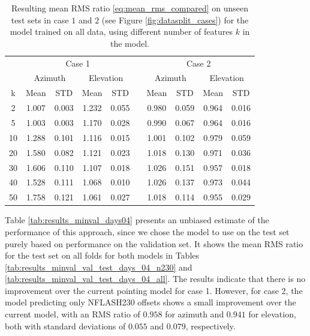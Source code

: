 \begin{table}[!htbp]
    \centering
    \caption[All instruments model results for complexity $k$]{%
    Resulting mean RMS ratio \eqref{eq:mean_rms_compared} on unseen test sets in case $1$ and $2$ (see Figure \ref{fig:datasplit_cases}) for the model trained on all data,
    using different number of features $k$ in the model.}
    \begin{tabular}{ccccc c cccc}
        \toprule
        \multicolumn{1}{c}{} & \multicolumn{4}{c}{Case 1} & & \multicolumn{4}{c}{Case 2} \\
        \cmidrule(lr){2-5} \cmidrule(lr){7-10}
        \multicolumn{1}{c}{} & \multicolumn{2}{c}{Azimuth} & \multicolumn{2}{c}{Elevation} & & \multicolumn{2}{c}{Azimuth} & \multicolumn{2}{c}{Elevation} \\ 
        \cmidrule(lr){2-5} \cmidrule(lr){7-10}
        k & Mean & STD & Mean & STD & & Mean & STD & Mean & STD \\ 
        \midrule
         2 &     1.007 &     0.003 &     1.232 &     0.055 &  &  0.980 &     0.059 &     0.964 &     0.016 \\
         5 &     1.003 &     0.003 &     1.170 &     0.028 &  &  0.990 &     0.067 &     0.964 &     0.016 \\
        10 &     1.288 &     0.101 &     1.116 &     0.015 &  &  1.001 &     0.102 &     0.979 &     0.059 \\
        20 &     1.580 &     0.082 &     1.121 &     0.023 &  &  1.018 &     0.130 &     0.971 &     0.036 \\
        30 &     1.606 &     0.110 &     1.107 &     0.018 &  &  1.026 &     0.151 &     0.957 &     0.018 \\
        40 &     1.528 &     0.111 &     1.068 &     0.010 &  &  1.026 &     0.137 &     0.973 &     0.044 \\
        50 &     1.758 &     0.121 &     1.061 &     0.027 &  &  1.018 &     0.114 &     0.955 &     0.029 \\
        \bottomrule
    \end{tabular}
    \label{tab:results_all_days}
\end{table}



\newpage

Table \ref{tab:results_minval_days04} presents an unbiased estimate of the performance of this approach,
since we chose the model to use on the test set purely based on performance on the validation set.
It shows the mean RMS ratio for the test set on all folds for both models in Tables \ref{tab:results_minval_val_test_days_04_n230} and \ref{tab:results_minval_val_test_days_04_all}.
The results indicate that there is no improvement over the current pointing model for case 1.
However, for case 2, the model predicting only NFLASH230 offsets shows a small improvement over the current model,
with an RMS ratio of $0.958$ for azimuth and $0.941$ for elevation, both with standard deviations of $0.055$ and $0.079$, respectively.\\

